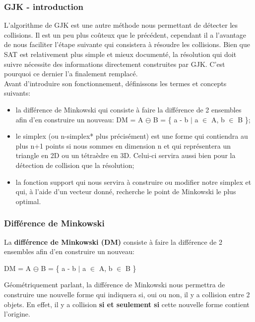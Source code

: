 \pagebreak

\subsubsection{GJK - introduction}
L'algorithme de GJK \citep{GJK1, GJK2} est une autre méthode nous permettant de détecter les collisions. Il est un peu plus coûteux que le précédent, cependant il a l'avantage de nous faciliter l'étape suivante qui consistera à résoudre les collisions. Bien que SAT est relativement plus simple et mieux documenté, la résolution qui doit suivre nécessite des informations directement construites par GJK. C'est pourquoi ce dernier l'a finalement remplacé.\\
Avant d'introduire son fonctionnement, définissons les termes et concepts suivants:

\begin{itemize}[label=$\bullet$]
	\item la différence de Minkowski qui consiste à faire la différence de 2 ensembles afin d'en construire un nouveau: DM = A $\ominus$ B = \{ a - b $\mid$ a $\in$ A, b $\in$ B \};
	\item le simplex (ou n-simplex* plus précisément) est une forme qui contiendra au plus n+1 points si nous sommes en dimension n et qui représentera un triangle en 2D ou un tétraèdre en 3D. Celui-ci servira aussi bien pour la détection de collision que la résolution;
	\item la fonction support qui nous servira à construire ou modifier notre simplex et qui, à l'aide d'un vecteur donné, recherche le point de Minkowski le plus optimal.
\end{itemize}

\subsubsection{Différence de Minkowski}
La \textbf{différence de Minkowski (DM)} consiste à faire la différence de 2 ensembles afin d'en construire un nouveau: 

\centerline{DM = A $\ominus$ B = \{ a - b $\mid$ a $\in$ A, b $\in$ B \}}
\noindent Géométriquement parlant, la différence de Minkowski nous permettra de construire une nouvelle forme qui indiquera si, oui ou non, il y a collision entre 2 objets. En effet, il y a collision \textbf{si et seulement si} cette nouvelle forme contient l'origine. \\

